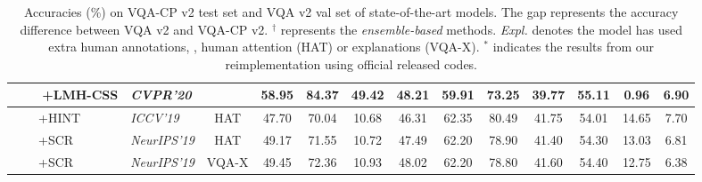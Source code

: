 \documentclass[10pt,twocolumn,letterpaper]{article}
\begin{document}
\begin{table*}
\begin{center}
{\begin{tabular}{| l | l | c | c c c c | c c c c| c c|}
				~~~~+\textbf{LMH-CSS} & \textit{CVPR'20} &  & \textbf{58.95} & \textbf{84.37} & \textbf{49.42} & \textbf{48.21} & 59.91 & 73.25 & 39.77 & 55.11 & \textbf{0.96} & \textbf{6.90} \\
				\hline\hline
				~~~~+HINT~\cite{selvaraju2019taking} & \textit{ICCV'19} & HAT & 47.70 & 70.04 & 10.68 & 46.31 & 62.35 & 80.49 & 41.75 & 54.01 & 14.65 & 7.70 \\
				~~~~+SCR~\cite{wu2019self} & \textit{NeurIPS'19} & HAT & 49.17 & 71.55 & 10.72 & 47.49 & 62.20 & 78.90 & 41.40 & 54.30 & 13.03  &  6.81 \\
				~~~~+SCR~\cite{wu2019self} & \textit{NeurIPS'19} & VQA-X & 49.45 & 72.36 & 10.93 & 48.02 & 62.20 & 78.80 & 41.60 & 54.40 & 12.75 & 6.38 \\
				\hline
			\end{tabular}
		} \end{center}
	\vspace{-1.5em}
	\caption[]{Accuracies (\%) on VQA-CP v2 test set and VQA v2 val set of state-of-the-art models. The gap represents the accuracy difference between VQA v2 and VQA-CP v2. $^\dagger$ represents the \emph{ensemble-based} methods. \emph{Expl.} denotes the model has used extra human annotations, \eg, human attention (HAT) or explanations (VQA-X). $^*$ indicates the results from our reimplementation using official released codes.} \label{tab:SOTA_v2}
	\vspace{-1.5em}
\end{table*}
\end{document}
